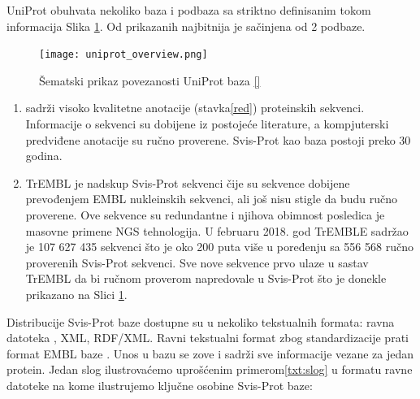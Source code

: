 UniProt obuhvata nekoliko baza i podbaza sa striktno definisanim tokom
informacija Slika \ref{fig:uniprot_overview}. Od prikazanih najbitnija je
  sačinjena od 2 podbaze.

\begin{figure}[h!]
  \centering
  \texttt{[image: uniprot\_overview.png]}
  \caption{Šematski prikaz povezanosti UniProt baza \ref{}}
  \label{fig:uniprot_overview}
\end{figure}

\begin{enumerate}
  \item {}  sadrži visoko kvalitetne anotacije
     (stavka\ref{red}) proteinskih sekvenci.
    Informacije o sekvenci su dobijene iz postojeće literature, a kompjuterski
    predviđene anotacije su ručno proverene. Svis-Prot kao baza postoji preko
    30 godina.

  \item TrEMBL  je nadskup Svis-Prot sekvenci čije su
    sekvence dobijene prevođenjem EMBL nukleinskih sekvenci, ali još nisu stigle
    da budu ručno  proverene. Ove sekvence su redundantne i njihova obimnost
    posledica je masovne primene NGS tehnologija. U februaru 2018. god TrEMBLE
    sadržao je 107 627 435 sekvenci što je oko 200 puta više u poređenju sa
    556 568 ručno proverenih Svis-Prot sekvenci. Sve nove sekvence prvo ulaze u
    sastav TrEMBL da bi ručnom proverom napredovale u Svis-Prot što je donekle
    prikazano na Slici \ref{fig:uniprot_overview}.
\end{enumerate}





Distribucije Svis-Prot baze dostupne su u nekoliko tekstualnih formata: ravna
datoteka , XML, RDF/XML.  Ravni tekstualni format zbog
standardizacije prati format EMBL \parencite{embl} baze
\parencite{svisprot2003}.  Unos u bazu se zove   i
sadrži sve informacije vezane za jedan protein. Jedan slog ilustrovaćemo
uprošćenim primerom\ref{txt:slog} u formatu ravne datoteke na kome ilustrujemo
ključne osobine Svis-Prot baze:

